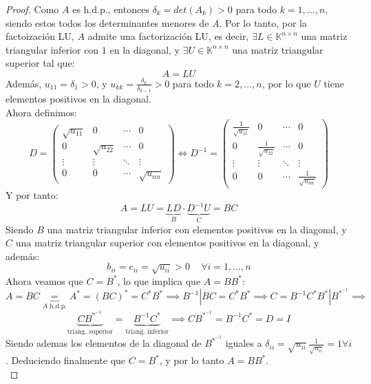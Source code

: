\begin{proof}
    Como $A$ es h.d.p., entonces $\delta_k = det(A_k) > 0$ para todo $k=1, \ldots, n$, siendo estos todos los determinantes menores de $A$. Por lo tanto, por la factoización LU, $A$ admite una factorización LU, es decir, $\exists L \in \mathbb{K}^{n \times n}$ una matriz triangular inferior con $1$ en la diagonal, y $\exists U \in \mathbb{K}^{n \times n}$ una matriz triangular superior tal que:
    \[
        A = LU
    \]
    Además, $u_{11} = \delta_1 > 0$, y $u_{kk} = \frac{\delta_k}{\delta_{k-1}} > 0$ para todo $k=2, \ldots, n$, por lo que $U$ tiene elementos positivos en la diagonal.\\
    Ahora definimos:
    \[
        D = \begin{pmatrix}
            \sqrt{u_{11}} & 0 & \cdots & 0 \\
            0 & \sqrt{u_{22}} & \cdots & 0 \\
            \vdots & \vdots & \ddots & \vdots \\
            0 & 0 & \cdots & \sqrt{u_{nn}}
        \end{pmatrix} \iff
        D^{-1} = \begin{pmatrix}
            \frac{1}{\sqrt{u_{11}}} & 0 & \cdots & 0 \\
            0 & \frac{1}{\sqrt{u_{22}}} & \cdots & 0 \\
            \vdots & \vdots & \ddots & \vdots \\
            0 & 0 & \cdots & \frac{1}{\sqrt{u_{nn}}}
        \end{pmatrix}
    \]
    Y por tanto:
    \[
        A =
        LU =
        \underbrace{L D}_{B} \cdot \underbrace{D^{-1} U}_{C} =
        B C
    \]
    Siendo $B$ una matriz triangular inferior con elementos positivos en la diagonal, y $C$ una matriz triangular superior con elementos positivos en la diagonal, y además:
    \[
        b_{ii} = c_{ii} = \sqrt{u_{ii}} > 0 \, \quad \forall i=1, \ldots, n
    \]
    Ahora veamos que $C = B^*$, lo que implica que $A = BB^*$:
    \[
        A =
        B C \underbrace{=}_{A \text{ h.d.p.}}
        A^* =
        (B C)^* =
        C^* B^* \implies
        B^{-1} | BC = C^* B^* \implies
        C = B^{-1} C^* B^* | B^{*^{-1}} \implies
    \]
    \[
        \underbrace{C B^{*^{-1}}}_{\text{triang. superior}} = \underbrace{B^{-1} C^*}_{\text{triang. inferior}} \implies
        C B^{*^{-1}} = B^{-1} C^* = D = I
    \]
    Siendo ademas los elementos de la diagonal de $B^{*^{-1}}$ iguales a $\delta_{ii} = \sqrt{u_{ii}} \frac{1}{\sqrt{u_{ii}}} = 1 \forall i$. Deduciendo finalmente que $C = B^*$, y por lo tanto $A = BB^*$.\\
\end{proof}